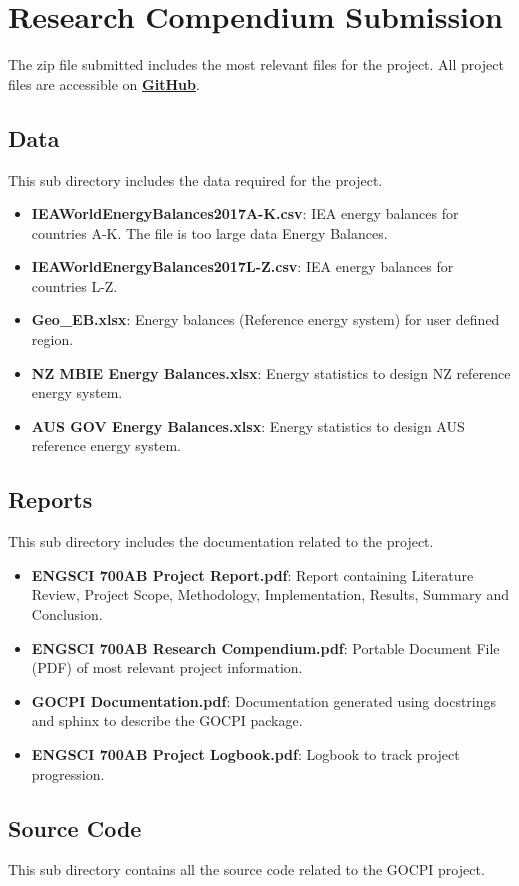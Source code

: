 \documentclass[12pt]{article}
\begin{document}
\tableofcontents
\listoffigures
\newpage
\section{Research Compendium Submission}
The zip file submitted includes the most relevant files for the project.
All project files are accessible on \textbf{\href{https://github.com/CMCD1996/GOCPI}{GitHub}}.
\subsection{Data}
This sub directory includes the data required for the project.
\begin{itemize}
    \item \textbf{IEAWorldEnergyBalances2017A-K.csv}: IEA energy balances for countries A-K. The file is too large data Energy Balances.
    \item \textbf{IEAWorldEnergyBalances2017L-Z.csv}: IEA energy balances for countries L-Z.
    \item \textbf{Geo\_EB.xlsx}: Energy balances (Reference energy system) for user defined region.
    \item \textbf{NZ MBIE Energy Balances.xlsx}: Energy statistics to design NZ reference energy system.
    \item \textbf{AUS GOV Energy Balances.xlsx}: Energy statistics to design AUS reference energy system.
\end{itemize}
\subsection{Reports}
This sub directory includes the documentation related to the project.
\begin{itemize}
    \item \textbf{ENGSCI 700AB Project Report.pdf}: Report containing Literature Review, Project Scope, Methodology, Implementation, Results, Summary and Conclusion.
    \item \textbf{ENGSCI 700AB Research Compendium.pdf}: Portable Document File (PDF) of most relevant project information.
    \item \textbf{GOCPI Documentation.pdf}: Documentation generated using docstrings and sphinx to describe the GOCPI package.
    \item \textbf{ENGSCI 700AB Project Logbook.pdf}: Logbook to track project progression.
\end{itemize}
\subsection{Source Code}
This sub directory contains all the source code related to the GOCPI project.
\end{document}
